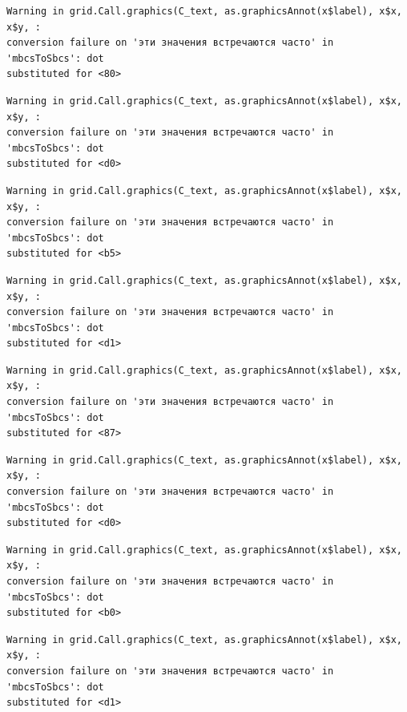 \documentclass[
  letterpaper,
  DIV=11,
  numbers=noendperiod]{scrreprt}
\theoremstyle{definition}
\theoremstyle{remark}
\begin{document}
\begin{verbatim}
Warning in grid.Call.graphics(C_text, as.graphicsAnnot(x$label), x$x, x$y, :
conversion failure on 'эти значения встречаются часто' in 'mbcsToSbcs': dot
substituted for <80>
\end{verbatim}

\begin{verbatim}
Warning in grid.Call.graphics(C_text, as.graphicsAnnot(x$label), x$x, x$y, :
conversion failure on 'эти значения встречаются часто' in 'mbcsToSbcs': dot
substituted for <d0>
\end{verbatim}

\begin{verbatim}
Warning in grid.Call.graphics(C_text, as.graphicsAnnot(x$label), x$x, x$y, :
conversion failure on 'эти значения встречаются часто' in 'mbcsToSbcs': dot
substituted for <b5>
\end{verbatim}

\begin{verbatim}
Warning in grid.Call.graphics(C_text, as.graphicsAnnot(x$label), x$x, x$y, :
conversion failure on 'эти значения встречаются часто' in 'mbcsToSbcs': dot
substituted for <d1>
\end{verbatim}

\begin{verbatim}
Warning in grid.Call.graphics(C_text, as.graphicsAnnot(x$label), x$x, x$y, :
conversion failure on 'эти значения встречаются часто' in 'mbcsToSbcs': dot
substituted for <87>
\end{verbatim}

\begin{verbatim}
Warning in grid.Call.graphics(C_text, as.graphicsAnnot(x$label), x$x, x$y, :
conversion failure on 'эти значения встречаются часто' in 'mbcsToSbcs': dot
substituted for <d0>
\end{verbatim}

\begin{verbatim}
Warning in grid.Call.graphics(C_text, as.graphicsAnnot(x$label), x$x, x$y, :
conversion failure on 'эти значения встречаются часто' in 'mbcsToSbcs': dot
substituted for <b0>
\end{verbatim}

\begin{verbatim}
Warning in grid.Call.graphics(C_text, as.graphicsAnnot(x$label), x$x, x$y, :
conversion failure on 'эти значения встречаются часто' in 'mbcsToSbcs': dot
substituted for <d1>
\end{verbatim}
\end{document}
